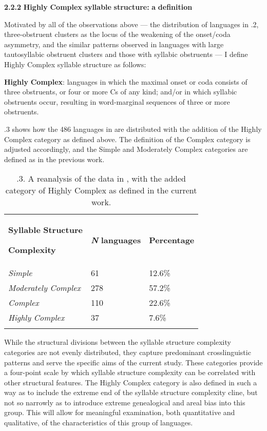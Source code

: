 \textbf{2.2.2} \textbf{Highly} \textbf{Complex} \textbf{syllable} \textbf{structure:} \textbf{a} \textbf{definition}

  Motivated by all of the observations above — the distribution of languages in .2, three-obstruent clusters as the locus of the weakening of the onset/coda asymmetry, and the similar patterns observed in languages with large tautosyllabic obstruent clusters and those with syllabic obstruents — I define Highly Complex syllable structure as follows:

\textbf{Highly} \textbf{Complex}: languages in which the maximal onset or coda consists of three obstruents, or four or more Cs of any kind; and/or in which syllabic obstruents occur, resulting in word-marginal sequences of three or more obstruents.

  .3 shows how the 486 languages in \citet{Maddieson2013a} are distributed with the addition of the Highly Complex category as defined above. The definition of the Complex category is adjusted accordingly, and the Simple and Moderately Complex categories are defined as in the previous work.

\begin{table}
\begin{tabularx}{\textwidth}{XXX}
\lsptoprule

\textbf{Syllable} \textbf{Structure} 

\textbf{Complexity} & \textbf{\textit{N}} \textbf{languages} & \textbf{Percentage}\\
\textit{Simple} & 61 & 12.6\%\\
\textit{Moderately} \textit{Complex} & 278 & 57.2\%\\
\textit{Complex} & 110 & 22.6\%\\
\textit{Highly} \textit{Complex} & 37 & 7.6\%\\
\lspbottomrule
\end{tabularx}
\caption{\label{tab:key:2}.3. A reanalysis of the data in \citet{Maddieson2013a}, with the added category of Highly Complex as defined in the current work.}
\end{table}

  While the structural divisions between the syllable structure complexity categories are not evenly distributed, they capture predominant crosslinguistic patterns and serve the specific aims of the current study. These categories provide a four-point scale by which syllable structure complexity can be correlated with other structural features. The Highly Complex category is also defined in such a way as to include the extreme end of the syllable structure complexity cline, but not so narrowly as to introduce extreme genealogical and areal bias into this group. This will allow for meaningful examination, both quantitative and qualitative, of the characteristics of this group of languages.

